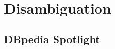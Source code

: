 
\chapter{Disambiguation} %

\label{chapter:Disambiguation} %


\section{DBpedia Spotlight} %
\label{sec:dbpedia_spotlight}

